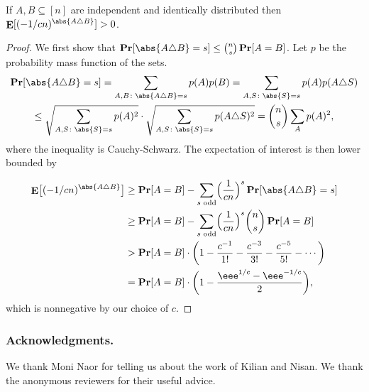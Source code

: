 \documentclass{toc}
\DeclareMathOperator\pr{\mathop{\bf Pr}}
\DeclareMathOperator\E{\mathop{\bf E}}
\begin{document}
\begin{claim}
If $A, B \subseteq [n]$ are independent and identically distributed then $\E[(-1/cn)^{\abs{A \triangle B}}] > 0$.  
\end{claim}
\begin{proof}
We first show that $\pr[\abs{A \triangle B} = s] \leq \binom{n}{s} \pr[A = B]$.  Let $p$ be the probability mass function of the sets.
\begin{multline*}
\pr[\abs{A \triangle B} = s] = \sum_{A, B\colon \abs{A \triangle B} = s} p(A) p(B) 
   = \sum_{A, S\colon \abs{S} = s} p(A) p(A \triangle S)  \\ \leq \sqrt{\sum_{A, S\colon \abs{S} = s} p(A)^2} \cdot \sqrt{\sum_{A, S\colon \abs{S} = s} p(A \triangle S)^2} = \binom{n}{s} \sum_A p(A)^2,
\end{multline*}
where the inequality is Cauchy-Schwarz.  The expectation of interest is then lower bounded by

\begin{align*}
\E\bigl[(-1/cn)^{\abs{A \triangle B}}\bigr] 
   &\geq \pr[A = B] - \sum_{\text{$s$ odd}} \Bigl(\frac{1}{cn}\Bigr)^s \pr[\abs{A \triangle B} = s] \\
   &\geq \pr[A = B] - \sum_{\text{$s$ odd}} \Bigl(\frac{1}{cn}\Bigr)^s \binom{n}{s} \pr[A = B] \\
   &> \pr[A = B] \cdot \biggl(1 - \frac{c^{-1}}{1!} - \frac{c^{-3}}{3!} - \frac{c^{-5}}{5!} - \cdots\biggr) \\
   &= \pr[A = B] \cdot \biggl(1 - \frac{\eee^{1/c} - \eee^{-1/c}}{2}\biggr), 
\end{align*}
which is nonnegative by our choice of $c$.
\end{proof}

%

\subsubsection*{Acknowledgments.}
We thank Moni Naor for telling us about the work of Kilian and Nisan. We thank the anonymous reviewers for their useful advice.



%
%
%
%

\end{document}
